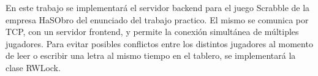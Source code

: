 En este trabajo se implementará el servidor backend para el juego Scrabble de la empresa HaSObro del enunciado del trabajo practico. El mismo se comunica por TCP, con un servidor frontend, y permite la conexión simultánea de múltiples jugadores. Para evitar posibles conflictos entre los distintos jugadores al momento de leer o escribir una letra al mismo tiempo en el tablero, se implementará la clase RWLock.
